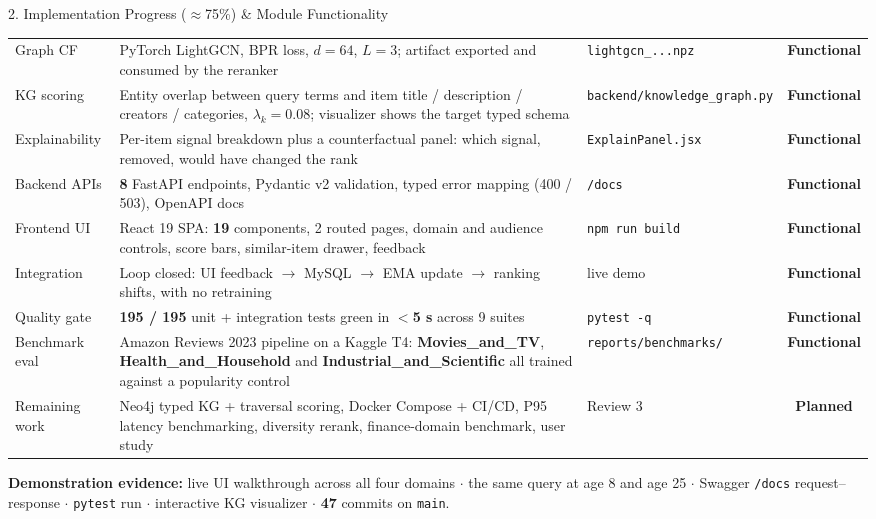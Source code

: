 \documentclass[aspectratio=169, 11pt]{beamer}
\newcommand{\sOK}{\textcolor{amritaTeal}{\textbf{Functional}}}
\newcommand{\sPLN}{\textcolor{amritaSlate}{\textbf{Planned}}}
\begin{document}
\begin{frame}{2. Implementation Progress ($\approx$75\%) \& Module Functionality}
\begin{table}
\begin{tabular}{p{1.95cm} p{6.75cm} p{1.45cm} c}
        Graph CF & PyTorch LightGCN, BPR loss, $d{=}64$, $L{=}3$; artifact exported and consumed by the reranker & \texttt{lightgcn\_...npz} & \sOK \\
        KG scoring & Entity overlap between query terms and item title / description / creators / categories, $\lambda_k{=}0.08$; visualizer shows the target typed schema & \texttt{backend/knowledge\_graph.py} & \sOK \\
        Explainability & Per-item signal breakdown plus a counterfactual panel: which signal, removed, would have changed the rank & \texttt{ExplainPanel.jsx} & \sOK \\
        Backend APIs & \textbf{8} FastAPI endpoints, Pydantic v2 validation, typed error mapping (400 / 503), OpenAPI docs & \texttt{/docs} & \sOK \\
        Frontend UI & React 19 SPA: \textbf{19} components, 2 routed pages, domain and audience controls, score bars, similar-item drawer, feedback & \texttt{npm run build} & \sOK \\
        Integration & Loop closed: UI feedback $\rightarrow$ MySQL $\rightarrow$ EMA update $\rightarrow$ ranking shifts, with no retraining & live demo & \sOK \\
        Quality gate & \textbf{195 / 195} unit + integration tests green in \textbf{$<$5 s} across 9 suites & \texttt{pytest -q} & \sOK \\
        \midrule
        Benchmark eval & Amazon Reviews 2023 pipeline on a Kaggle T4: \textbf{Movies\_and\_TV}, \textbf{Health\_and\_Household} and \textbf{Industrial\_and\_Scientific} all trained against a popularity control & \texttt{reports/benchmarks/} & \sOK \\
        Remaining work & Neo4j typed KG + traversal scoring, Docker Compose + CI/CD, P95 latency benchmarking, diversity rerank, finance-domain benchmark, user study & Review 3 & \sPLN \\
        \bottomrule
    \end{tabular}
\end{table}
\vspace{-1mm}
{\scriptsize \textbf{Demonstration evidence:} live UI walkthrough across all four domains $\cdot$ the same query at age 8 and age 25 $\cdot$
Swagger \texttt{/docs} request--response $\cdot$ \texttt{pytest} run $\cdot$ interactive KG visualizer $\cdot$ \textbf{47} commits on \texttt{main}.}
\end{frame}
\end{document}
